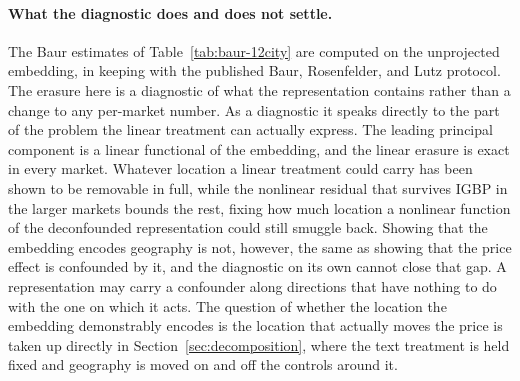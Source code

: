 \paragraph{What the diagnostic does and does not settle.} The Baur estimates of
Table~\ref{tab:baur-12city} are computed on the unprojected embedding, in keeping
with the published Baur, Rosenfelder, and Lutz protocol. The erasure here is a
diagnostic of what the representation contains rather than a change to any
per-market number. As a diagnostic it speaks directly to the part of the problem
the linear treatment can actually express. The leading principal component
is a linear functional of the embedding, and the linear erasure is exact in every
market. Whatever location a linear treatment could carry has been shown to be
removable in full, while the nonlinear residual that survives IGBP in the larger
markets bounds the rest, fixing how much location a nonlinear function of the
deconfounded representation could still smuggle back. Showing that the embedding
encodes geography is not, however, the same as showing that the price effect is
confounded by it, and the diagnostic on its own cannot close that gap. A
representation may carry a confounder along directions that have nothing to do
with the one on which it acts. The question of whether the location the embedding
demonstrably encodes is the location that actually moves the price is taken up
directly in Section~\ref{sec:decomposition}, where the text treatment is held
fixed and geography is moved on and off the controls around it.


